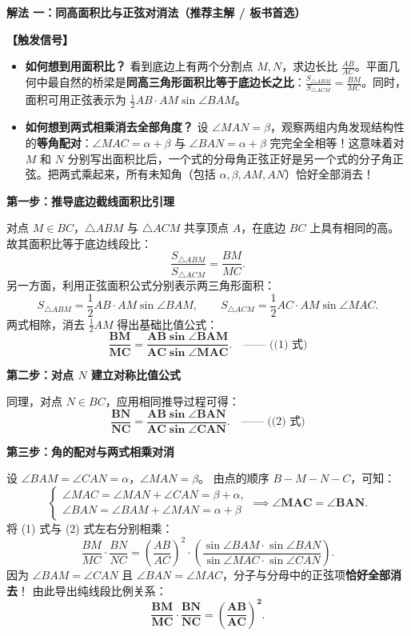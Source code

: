 \documentclass[11pt,a4paper,fontset=fandol]{ctexart}
\newcommand{\method}[1]{\par\medskip\noindent\textbf{解法 #1}\par}
\begin{document}
\method{一：同高面积比与正弦对消法（推荐主解 / 板书首选）}

\noindent\textbf{【触发信号】}
\begin{itemize}[leftmargin=1.5em]
  \item \textbf{如何想到用面积比？} 看到底边上有两个分割点 $M, N$，求边长比 $\frac{AB}{AC}$。平面几何中最自然的桥梁是\textbf{同高三角形面积比等于底边长之比}：$\frac{S_{\triangle ABM}}{S_{\triangle ACM}} = \frac{BM}{MC}$。同时，面积可用正弦表示为 $\frac{1}{2}AB \cdot AM \sin\angle BAM$。
  \item \textbf{如何想到两式相乘消去全部角度？} 设 $\angle MAN = \beta$，观察两组内角发现结构性的\textbf{等角配对}：$\angle MAC = \alpha + \beta$ 与 $\angle BAN = \alpha + \beta$ 完完全全相等！这意味着对 $M$ 和 $N$ 分别写出面积比后，一个式的分母角正弦正好是另一个式的分子角正弦。把两式乘起来，所有未知角（包括 $\alpha, \beta, AM, AN$）恰好全部消去！
\end{itemize}

\textbf{第一步：推导底边截线面积比引理}

对点 $M \in BC$，$\triangle ABM$ 与 $\triangle ACM$ 共享顶点 $A$，在底边 $BC$ 上具有相同的高。
故其面积比等于底边线段比：
\[
\frac{S_{\triangle ABM}}{S_{\triangle ACM}} = \frac{BM}{MC}.
\]
另一方面，利用正弦面积公式分别表示两三角形面积：
\[
S_{\triangle ABM} = \frac{1}{2} AB \cdot AM \sin\angle BAM, \qquad S_{\triangle ACM} = \frac{1}{2} AC \cdot AM \sin\angle MAC.
\]
两式相除，消去 $\frac{1}{2} AM$ 得出基础比值公式：
\[
\mathbf{\frac{BM}{MC} = \frac{AB \sin\angle BAM}{AC \sin\angle MAC}}. \quad \text{—— ((1) 式)}
\]

\textbf{第二步：对点 $N$ 建立对称比值公式}

同理，对点 $N \in BC$，应用相同推导过程可得：
\[
\mathbf{\frac{BN}{NC} = \frac{AB \sin\angle BAN}{AC \sin\angle CAN}}. \quad \text{—— ((2) 式)}
\]

\textbf{第三步：角的配对与两式相乘对消}

设 $\angle BAM = \angle CAN = \alpha$，$\angle MAN = \beta$。
由点的顺序 $B-M-N-C$，可知：
\[
\begin{cases}
\angle MAC = \angle MAN + \angle CAN = \beta + \alpha,\\[0.3em]
\angle BAN = \angle BAM + \angle MAN = \alpha + \beta
\end{cases}
\implies \mathbf{\angle MAC = \angle BAN}.
\]
将 (1) 式与 (2) 式左右分别相乘：
\[
\frac{BM}{MC} \cdot \frac{BN}{NC} = \left(\frac{AB}{AC}\right)^2 \cdot \left( \frac{\sin\angle BAM \cdot \sin\angle BAN}{\sin\angle MAC \cdot \sin\angle CAN} \right).
\]
因为 $\angle BAM = \angle CAN$ 且 $\angle BAN = \angle MAC$，分子与分母中的正弦项\textbf{恰好全部消去}！
由此导出纯线段比例关系：
\[
\mathbf{\frac{BM}{MC} \cdot \frac{BN}{NC} = \left(\frac{AB}{AC}\right)^2}.
\]
\end{document}
